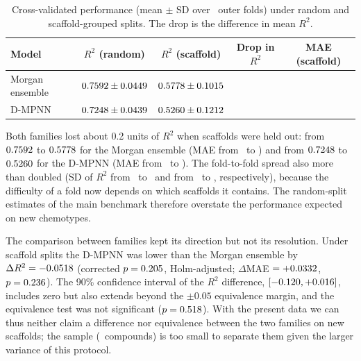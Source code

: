 \begin{table}[htbp]
	\centering
	\caption{Cross-validated performance (mean $\pm$ SD over \TotalOuterFolds\ outer folds) under random and scaffold-grouped splits. The drop is the difference in mean $R^2$.}
	\label{tab:scaffold}
	\begin{tabular}{lcccc}
		\hline
		Model & $R^2$ (random) & $R^2$ (scaffold) & Drop in $R^2$ & MAE (scaffold) \\
		\hline
		Morgan ensemble & $0.7592 \pm 0.0449$ & $0.5778 \pm 0.1015$ & \ScaffoldMorganDropRTwo & \ScaffoldMorganMae \\
		D-MPNN & $0.7248 \pm 0.0439$ & $0.5260 \pm 0.1212$ & \ScaffoldGnnDropRTwo & \ScaffoldGnnMae \\
		\hline
	\end{tabular}
\end{table}

Both families lost about 0.2 units of $R^2$ when scaffolds were held out: from $0.7592$ to $0.5778$ for the Morgan ensemble (MAE from \RandomMorganMae\ to \ScaffoldMorganMae) and from $0.7248$ to $0.5260$ for the D-MPNN (MAE from \RandomGnnMae\ to \ScaffoldGnnMae). The fold-to-fold spread also more than doubled (SD of $R^2$ from \RandomMorganRTwoStd\ to \ScaffoldMorganRTwoStd\ and from \RandomGnnRTwoStd\ to \ScaffoldGnnRTwoStd, respectively), because the difficulty of a fold now depends on which scaffolds it contains. The random-split estimates of the main benchmark therefore overstate the performance expected on new chemotypes.

The comparison between families kept its direction but not its resolution. Under scaffold splits the D-MPNN was lower than the Morgan ensemble by $\Delta R^2 = -0.0518$ (corrected $p = 0.205$, Holm-adjusted; $\Delta$MAE $= +0.0332$, $p = 0.236$). The 90\% confidence interval of the $R^2$ difference, $[-0.120, +0.016]$, includes zero but also extends beyond the $\pm 0.05$ equivalence margin, and the equivalence test was not significant ($p = 0.518$). With the present data we can thus neither claim a difference nor equivalence between the two families on new scaffolds; the sample (\NCompounds\ compounds) is too small to separate them given the larger variance of this protocol.

